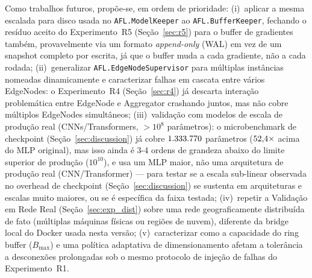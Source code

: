 \documentclass[conference,a4paper]{IEEEtran}
\begin{document}
Como trabalhos futuros, propõe-se, em ordem de prioridade:
(i)~aplicar a mesma escalada para disco usada no \texttt{AFL.ModelKeeper}
ao \texttt{AFL.BufferKeeper}, fechando o resíduo aceito do Experimento~R5
(Seção~\ref{sec:r5}) para o buffer de gradientes também, provavelmente
via um formato \textit{append-only} (WAL) em vez de um snapshot completo
por escrita, já que o buffer muda a cada gradiente, não a cada rodada;
(ii)~generalizar \texttt{AFL.EdgeNodeSupervisor} para múltiplas instâncias
nomeadas dinamicamente e caracterizar falhas em cascata entre vários
EdgeNodes: o Experimento~R4 (Seção~\ref{sec:r4}) já descarta interação
problemática entre EdgeNode e Aggregator crashando juntos, mas não cobre
múltiplos EdgeNodes simultâneos;
(iii)~validação com modelos de escala de produção real
(CNNs/Transformers, $>10^8$ parâmetros): o microbenchmark de
checkpoint (Seção~\ref{sec:discussion}) já cobre $1{.}333{.}770{}$
parâmetros ($52{,}4\times$ acima do MLP original), mas isso ainda é
3-4 ordens de grandeza abaixo do limite superior de produção
($10^{10}$), e usa um MLP maior, não uma arquitetura de produção real
(CNN/Transformer) --- para testar se a escala sub-linear observada no
overhead de checkpoint (Seção~\ref{sec:discussion}) se sustenta em
arquiteturas e escalas muito maiores, ou se é específica da faixa
testada;
(iv)~repetir a Validação em Rede Real (Seção~\ref{sec:exp_dist}) sobre uma
rede geograficamente distribuída de fato (múltiplas máquinas físicas ou
regiões de nuvem), diferente da bridge local do Docker usada nesta
versão;
(v)~caracterizar como a capacidade do ring buffer ($B_{\max}$) e uma
política adaptativa de dimensionamento afetam a tolerância a
desconexões prolongadas sob o mesmo protocolo de injeção de falhas do
Experimento~R1.



\end{document}

